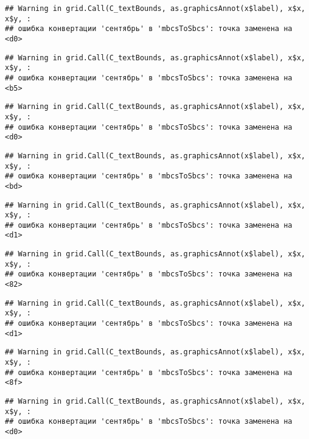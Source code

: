\documentclass[
]{article}
\begin{document}
\begin{verbatim}
## Warning in grid.Call(C_textBounds, as.graphicsAnnot(x$label), x$x, x$y, :
## ошибка конвертации 'сентябрь' в 'mbcsToSbcs': точка заменена на <d0>
\end{verbatim}

\begin{verbatim}
## Warning in grid.Call(C_textBounds, as.graphicsAnnot(x$label), x$x, x$y, :
## ошибка конвертации 'сентябрь' в 'mbcsToSbcs': точка заменена на <b5>
\end{verbatim}

\begin{verbatim}
## Warning in grid.Call(C_textBounds, as.graphicsAnnot(x$label), x$x, x$y, :
## ошибка конвертации 'сентябрь' в 'mbcsToSbcs': точка заменена на <d0>
\end{verbatim}

\begin{verbatim}
## Warning in grid.Call(C_textBounds, as.graphicsAnnot(x$label), x$x, x$y, :
## ошибка конвертации 'сентябрь' в 'mbcsToSbcs': точка заменена на <bd>
\end{verbatim}

\begin{verbatim}
## Warning in grid.Call(C_textBounds, as.graphicsAnnot(x$label), x$x, x$y, :
## ошибка конвертации 'сентябрь' в 'mbcsToSbcs': точка заменена на <d1>
\end{verbatim}

\begin{verbatim}
## Warning in grid.Call(C_textBounds, as.graphicsAnnot(x$label), x$x, x$y, :
## ошибка конвертации 'сентябрь' в 'mbcsToSbcs': точка заменена на <82>
\end{verbatim}

\begin{verbatim}
## Warning in grid.Call(C_textBounds, as.graphicsAnnot(x$label), x$x, x$y, :
## ошибка конвертации 'сентябрь' в 'mbcsToSbcs': точка заменена на <d1>
\end{verbatim}

\begin{verbatim}
## Warning in grid.Call(C_textBounds, as.graphicsAnnot(x$label), x$x, x$y, :
## ошибка конвертации 'сентябрь' в 'mbcsToSbcs': точка заменена на <8f>
\end{verbatim}

\begin{verbatim}
## Warning in grid.Call(C_textBounds, as.graphicsAnnot(x$label), x$x, x$y, :
## ошибка конвертации 'сентябрь' в 'mbcsToSbcs': точка заменена на <d0>
\end{verbatim}
\end{document}
